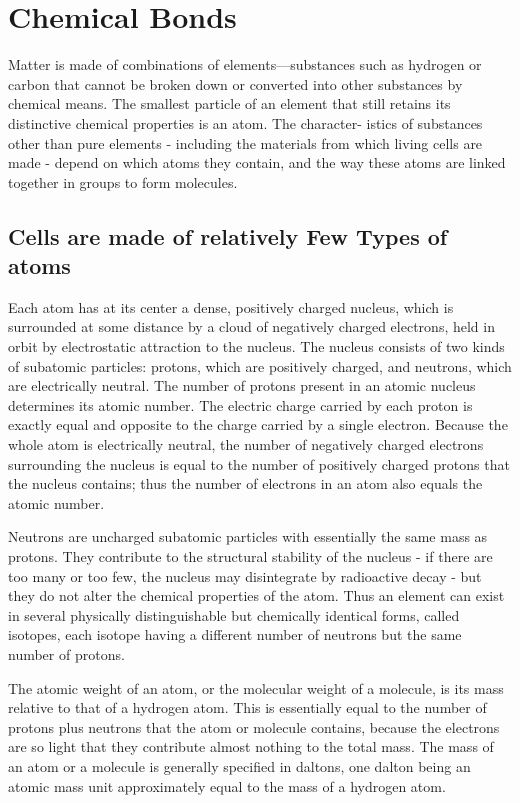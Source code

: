 \section{Chemical Bonds}

Matter is made of combinations of elements—substances such as hydrogen
or carbon that cannot be broken down or converted into other
substances by chemical means. The smallest particle of an element that
still retains its distinctive chemical properties is an atom. The character-
istics of substances other than pure elements - including the materials
from which living cells are made - depend on which atoms they contain,
and the way these atoms are linked together in groups to form molecules.

\subsection{Cells are made of relatively Few Types of atoms}

Each atom has at its center a dense, positively charged nucleus, which
is surrounded at some distance by a cloud of negatively charged electrons,
held in orbit by electrostatic attraction to the nucleus.
The nucleus consists of two kinds of subatomic particles: protons, which
are positively charged, and neutrons, which are electrically neutral. The
number of protons present in an atomic nucleus determines its atomic
number. The electric charge carried by each proton is exactly
equal and opposite to the charge carried by a single electron. Because
the whole atom is electrically neutral, the number of negatively charged
electrons surrounding the nucleus is equal to the number of positively
charged protons that the nucleus contains; thus the number of electrons
in an atom also equals the atomic number.

Neutrons are uncharged subatomic particles with essentially the same
mass as protons. They contribute to the structural stability of the nucleus -
if there are too many or too few, the nucleus may disintegrate by
radioactive decay - but they do not alter the chemical properties of the
atom. Thus an element can exist in several physically distinguishable but
chemically identical forms, called isotopes, each isotope having a different
number of neutrons but the same number of protons.

The atomic weight of an atom, or the molecular weight of a molecule,
is its mass relative to that of a hydrogen atom. This is essentially equal to
the number of protons plus neutrons that the atom or molecule contains,
because the electrons are so light that they contribute almost nothing to
the total mass. The mass of an atom or a molecule is generally specified in
daltons, one dalton being an atomic mass unit approximately equal to the mass
of a hydrogen atom.

